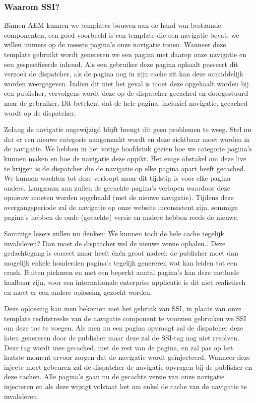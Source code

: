 \documentclass{article}
\begin{document}
	\subsubsection{Waarom SSI?}
    Binnen AEM kunnen we templates bouwen aan de hand van bestaande componenten, een goed voorbeeld is een template die een navigatie bevat, we willen immers op de meeste pagina's onze navigatie tonen. Wanneer deze template gebruikt wordt genereren we een pagina met daarop onze navigatie en een gespecifieerde inhoud. Als een gebruiker deze pagina ophaalt passeert dit verzoek de dispatcher, als de pagina nog in zijn cache zit kan deze onmiddelijk worden weergegeven. Indien dit niet het geval is moet deze opgehaalt worden bij een publisher, vervolgens wordt deze op de dispatcher gecached en doorgestuurd naar de gebruiker. Dit betekent dat de hele pagina, inclusief navigatie, gecached wordt op de dispatcher. 
    \par
    Zolang de navigatie ongewijzigd blijft brengt dit geen problemen te weeg. Stel nu dat er een nieuwe categorie aangemaakt wordt en deze zichtbaar moet worden in de navigatie. We hebben in het vorige hoofdstuk gezien hoe we categorie pagina's kunnen maken en hoe de navigatie deze oppikt. Het enige obstakel om deze live te krijgen is de dispatcher die de navigatie op elke pagina apart heeft gecached. We kunnen wachten tot deze verloopt maar dit tijdstip is voor elke pagina anders. Langzaam aan zullen de gecachte pagina's verlopen waardoor deze opnieuw moeten worden opgehaald (met de nieuwe navigatie). Tijdens deze overgangsperiode zal de navigatie op onze website inconsistent zijn, sommige pagina's hebben de oude (gecachte) versie en andere hebben reeds de nieuwe.
    \par
    Sommige lezers zullen nu denken: \"We kunnen toch de hele cache tegelijk invalideren? Dan moet de dispatcher wel de nieuwe versie ophalen.\". Deze gedachtegang is correct maar heeft \'en\'en groot nadeel: de publisher moet dan mogelijk enkele honderden pagina's tegelijk genereren wat kan leiden tot een crash. Buiten piekuren en met een beperkt aantal pagina's kan deze methode haalbaar zijn, voor een internationale enterprise applicatie is dit niet realistisch en moet er een andere oplossing gezocht worden.
    \par
    Deze oplossing kan men bekomen met het gebruik van SSI, in plaats van onze template rechtstreeks van de navigatie component te voorzien gebruiken we SSI om deze toe te voegen. Als men nu een pagina opvraagt zal de dispatcher deze laten genereren door de publisher maar deze zal de SSI-tag nog niet resolven. Deze tag wordt mee gecached, met de rest van de pagina, en zal pas op het laatste moment ervoor zorgen dat de navigatie wordt geïnjecteerd. Wanneer deze injecte moet gebeuren zal de dispatcher de navigatie opvragen bij de publisher en deze cachen. Alle pagina's gaan nu de gecachte versie van onze navigatie injecteren en als deze wijzigt volstaat het om enkel de cache van de navigatie te invalideren.
\end{document}
